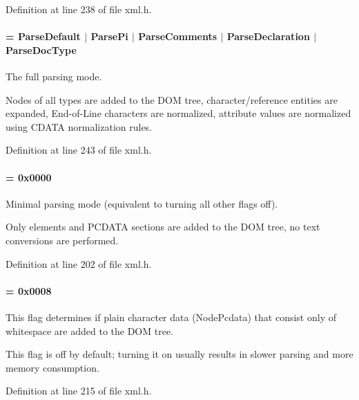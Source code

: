 Definition at line 238 of file xml.h.

\hypertarget{namespacephys_1_1xml_af1c356f1eb063a63efebd6c8a5241c63}{
\paragraph[{ParseFull}]{ = {\bf ParseDefault} $|$ {\bf ParsePi} $|$ {\bf ParseComments} $|$ {\bf ParseDeclaration} $|$ {\bf ParseDocType}}\hfill}
\label{d9/d27/namespacephys_1_1xml_af1c356f1eb063a63efebd6c8a5241c63}


The full parsing mode. 

Nodes of all types are added to the DOM tree, character/reference entities are expanded, End-\/of-\/Line characters are normalized, attribute values are normalized using CDATA normalization rules. 

Definition at line 243 of file xml.h.

\hypertarget{namespacephys_1_1xml_ab660837afbc6aaab22425d8d23e8f2e4}{
\paragraph[{ParseMinimal}]{ = 0x0000}\hfill}
\label{d9/d27/namespacephys_1_1xml_ab660837afbc6aaab22425d8d23e8f2e4}


Minimal parsing mode (equivalent to turning all other flags off). 

Only elements and PCDATA sections are added to the DOM tree, no text conversions are performed. 

Definition at line 202 of file xml.h.

\hypertarget{namespacephys_1_1xml_a48c0da99d1ed62b1a4984293e64828c6}{
\paragraph[{ParseWsPcdata}]{ = 0x0008}\hfill}
\label{d9/d27/namespacephys_1_1xml_a48c0da99d1ed62b1a4984293e64828c6}


This flag determines if plain character data (NodePcdata) that consist only of whitespace are added to the DOM tree. 

This flag is off by default; turning it on usually results in slower parsing and more memory consumption. 

Definition at line 215 of file xml.h.

